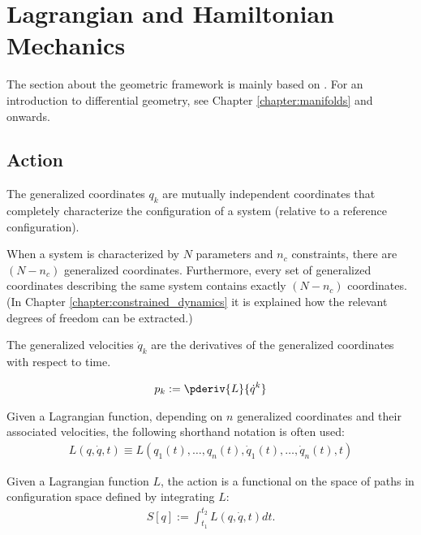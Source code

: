 \chapter{Lagrangian and Hamiltonian Mechanics}\label{chapter:lagrange}

    The section about the geometric framework is mainly based on \cite{arnold, palais_solitons}. For an introduction to differential geometry, see Chapter \ref{chapter:manifolds} and onwards.

\section{Action}

    \begin{definition}
        The generalized coordinates $q_k$ are mutually independent coordinates that completely characterize the configuration of a system (relative to a reference configuration).

        When a system is characterized by $N$ parameters and $n_c$ constraints, there are $(N-n_c)$ generalized coordinates. Furthermore, every set of generalized coordinates describing the same system contains exactly $(N-n_c)$ coordinates. (In Chapter \ref{chapter:constrained_dynamics} it is explained how the relevant degrees of freedom can be extracted.)
    \end{definition}
    \begin{definition}
        The generalized velocities $\dot{q}_k$ are the derivatives of the generalized coordinates with respect to time.
    \end{definition}
    \begin{definition}\label{lagrange:conjugate_momentum}
        \begin{gather}
            p_k := \pderiv{L}{\dot{q}^k}
        \end{gather}
    \end{definition}

    \begin{notation}\label{lagrange:notational_convention_1}
        Given a Lagrangian function, depending on $n$ generalized coordinates and their associated velocities, the following shorthand notation is often used:
        \begin{gather}
            L\left(q,\dot{q},t\right)\equiv L\left(q_1(t),\ldots,q_n(t),\dot{q}_1(t),\ldots,\dot{q}_n(t),t\right)
        \end{gather}
    \end{notation}
    \begin{definition}[Action]\label{lagrange:action}
        Given a Lagrangian function $L$, the action is a functional on the space of paths in configuration space defined by integrating $L$:
        \begin{gather}
            S[q] := \int_{t_1}^{t_2}L\left(q,\dot{q},t\right)dt.
        \end{gather}
    \end{definition}

